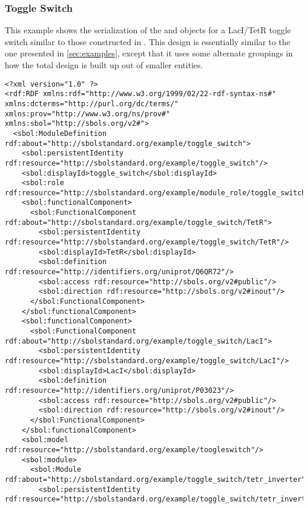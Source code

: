 \subsubsection{Toggle Switch}

This example shows the serialization of the  and  objects for a LacI/TetR toggle switch similar to those constructed in \cite{Gardner2000}.  
This design is essentially similar to the one presented in \ref{sec:examples}, except that it uses some alternate groupings in how the total design is built up out of smaller entities.

\label{ser:toggleswitch}
\begin{lstlisting}
<?xml version="1.0" ?>
<rdf:RDF xmlns:rdf="http://www.w3.org/1999/02/22-rdf-syntax-ns#" xmlns:dcterms="http://purl.org/dc/terms/" xmlns:prov="http://www.w3.org/ns/prov#" xmlns:sbol="http://sbols.org/v2#">
  <sbol:ModuleDefinition rdf:about="http://sbolstandard.org/example/toggle_switch">
    <sbol:persistentIdentity rdf:resource="http://sbolstandard.org/example/toggle_switch"/>
    <sbol:displayId>toggle_switch</sbol:displayId>
    <sbol:role rdf:resource="http://sbolstandard.org/example/module_role/toggle_switch"/>
    <sbol:functionalComponent>
      <sbol:FunctionalComponent rdf:about="http://sbolstandard.org/example/toggle_switch/TetR">
        <sbol:persistentIdentity rdf:resource="http://sbolstandard.org/example/toggle_switch/TetR"/>
        <sbol:displayId>TetR</sbol:displayId>
        <sbol:definition rdf:resource="http://identifiers.org/uniprot/Q6QR72"/>
        <sbol:access rdf:resource="http://sbols.org/v2#public"/>
        <sbol:direction rdf:resource="http://sbols.org/v2#inout"/>
      </sbol:FunctionalComponent>
    </sbol:functionalComponent>
    <sbol:functionalComponent>
      <sbol:FunctionalComponent rdf:about="http://sbolstandard.org/example/toggle_switch/LacI">
        <sbol:persistentIdentity rdf:resource="http://sbolstandard.org/example/toggle_switch/LacI"/>
        <sbol:displayId>LacI</sbol:displayId>
        <sbol:definition rdf:resource="http://identifiers.org/uniprot/P03023"/>
        <sbol:access rdf:resource="http://sbols.org/v2#public"/>
        <sbol:direction rdf:resource="http://sbols.org/v2#inout"/>
      </sbol:FunctionalComponent>
    </sbol:functionalComponent>
    <sbol:model rdf:resource="http://sbolstandard.org/example/toogleswitch"/>
    <sbol:module>
      <sbol:Module rdf:about="http://sbolstandard.org/example/toggle_switch/tetr_inverter">
        <sbol:persistentIdentity rdf:resource="http://sbolstandard.org/example/toggle_switch/tetr_inverter"/>

\end{lstlisting}

